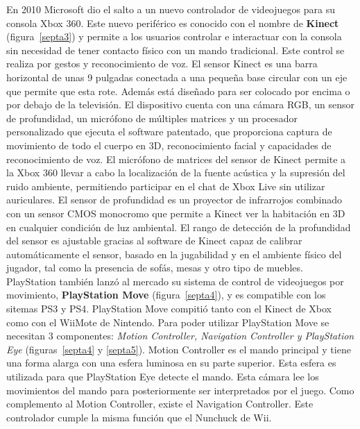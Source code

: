 En 2010 Microsoft dio el salto a un nuevo controlador de videojuegos para su consola Xbox 360. Este nuevo perif\'erico es conocido con el nombre de \textbf{Kinect} (figura~\ref{septa3}) y permite a los usuarios controlar e interactuar con la consola sin necesidad de tener contacto f\'isico con un mando tradicional. Este control se realiza por gestos y reconocimiento de voz. El sensor Kinect es una barra horizontal de unas 9 pulgadas conectada a una peque\~na base circular con un eje que permite que esta rote. Adem\'as est\'a dise\~nado para ser colocado por encima o por debajo de la televisi\'on. El dispositivo cuenta con una c\'amara RGB, un sensor de profundidad, un micr\'ofono de m\'ultiples matrices y un procesador personalizado que ejecuta el software patentado, que proporciona captura de movimiento de todo el cuerpo en 3D, reconocimiento facial y capacidades de reconocimiento de voz. El micr\'ofono de matrices del sensor de Kinect permite a la Xbox 360 llevar a cabo la localizaci\'on de la fuente ac\'ustica y la supresi\'on del ruido ambiente, permitiendo participar en el chat de Xbox Live sin utilizar auriculares. El sensor de profundidad es un proyector de infrarrojos combinado con un sensor CMOS monocromo que permite a Kinect ver la habitaci\'on en 3D en cualquier condici\'on de luz ambiental. El rango de detecci\'on de la profundidad del sensor es ajustable gracias al software de Kinect capaz de calibrar autom\'aticamente el sensor, basado en la jugabilidad y en el ambiente f\'isico del jugador, tal como la presencia de sof\'as, mesas y otro tipo de muebles.\\

PlayStation tambi\'en lanz\'o al mercado su sistema de control de videojuegos por movimiento, \textbf{PlayStation Move} (figura~\ref{septa4}), y es compatible con los sitemas PS3 y PS4. PlayStation Move compiti\'o tanto con el Kinect de Xbox como con el WiiMote de Nintendo. Para poder utilizar PlayStation Move se necesitan 3 componentes: \textit{Motion Controller, Navigation Controller y PlayStation Eye} (figuras~\ref{septa4} y \ref{septa5}). Motion Controller es el mando principal y tiene una forma alarga con una esfera luminosa en su parte superior. Esta esfera es utilizada para que PlayStation Eye detecte el mando. Esta c\'amara lee los movimientos del mando para posteriormente ser interpretados por el juego. Como complemento al Motion Controller, existe el Navigation Controller. Este controlador cumple la misma funci\'on que el Nunchuck de Wii. \\

